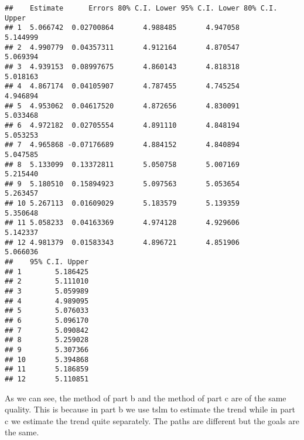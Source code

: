 \documentclass[]{article}
\newenvironment{Shaded}{\begin{snugshade}}{\end{snugshade}}
\newcommand{\KeywordTok}[1]{\textcolor[rgb]{0.13,0.29,0.53}{\textbf{#1}}}
\newcommand{\NormalTok}[1]{#1}
\newcommand{\OperatorTok}[1]{\textcolor[rgb]{0.81,0.36,0.00}{\textbf{#1}}}
\newcommand{\StringTok}[1]{\textcolor[rgb]{0.31,0.60,0.02}{#1}}
\begin{document}
\begin{Shaded}
\end{Shaded}

\begin{verbatim}
##    Estimate      Errors 80% C.I. Lower 95% C.I. Lower 80% C.I. Upper
## 1  5.066742  0.02700864       4.988485       4.947058       5.144999
## 2  4.990779  0.04357311       4.912164       4.870547       5.069394
## 3  4.939153  0.08997675       4.860143       4.818318       5.018163
## 4  4.867174  0.04105907       4.787455       4.745254       4.946894
## 5  4.953062  0.04617520       4.872656       4.830091       5.033468
## 6  4.972182  0.02705554       4.891110       4.848194       5.053253
## 7  4.965868 -0.07176689       4.884152       4.840894       5.047585
## 8  5.133099  0.13372811       5.050758       5.007169       5.215440
## 9  5.180510  0.15894923       5.097563       5.053654       5.263457
## 10 5.267113  0.01609029       5.183579       5.139359       5.350648
## 11 5.058233  0.04163369       4.974128       4.929606       5.142337
## 12 4.981379  0.01583343       4.896721       4.851906       5.066036
##    95% C.I. Upper
## 1        5.186425
## 2        5.111010
## 3        5.059989
## 4        4.989095
## 5        5.076033
## 6        5.096170
## 7        5.090842
## 8        5.259028
## 9        5.307366
## 10       5.394868
## 11       5.186859
## 12       5.110851
\end{verbatim}

As we can see, the method of part b and the method of part c are of the
same quality. This is because in part b we use tslm to estimate the
trend while in part c we estimate the trend quite separately. The paths
are different but the goals are the same.
\end{document}
